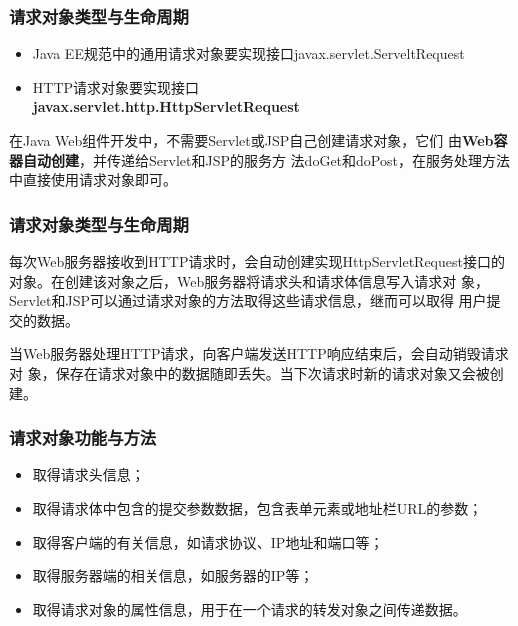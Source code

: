 \begin{frame}
  \frametitle{请求对象类型与生命周期} 
  \begin{itemize}
  \item Java EE规范中的通用请求对象要实现接口javax.servlet.ServeltRequest
  \item HTTP请求对象要实现接口\\{\bf\Red javax.servlet.http.HttpServletRequest}
  \end{itemize}


  在Java Web组件开发中，不需要Servlet或JSP自己创建请求对象，它们
  由{\bf\Blue Web容器自动创建}，并传递给Servlet和JSP的服务方
  法doGet和doPost，在服务处理方法中直接使用请求对象即可。
\end{frame}

\begin{frame}
  \frametitle{请求对象类型与生命周期} 

  每次Web服务器接收到HTTP请求时，会自动创建实现HttpServletRequest接口的
  对象。在创建该对象之后，Web服务器将请求头和请求体信息写入请求对
  象，Servlet和JSP可以通过请求对象的方法取得这些请求信息，继而可以取得
  用户提交的数据。


  当Web服务器处理HTTP请求，向客户端发送HTTP响应结束后，会自动销毁请求对
  象，保存在请求对象中的数据随即丢失。当下次请求时新的请求对象又会被创
  建。
\end{frame}

\begin{frame}[fragile] %
  \frametitle{请求对象功能与方法} 

  
  \begin{itemize}
  \item 取得请求头信息；
  \item 取得请求体中包含的提交参数数据，包含表单元素或地址栏URL的参数；
  \item 取得客户端的有关信息，如请求协议、IP地址和端口等；
  \item 取得服务器端的相关信息，如服务器的IP等；
  \item 取得请求对象的属性信息，用于在一个请求的转发对象之间传递数据。
  \end{itemize}
\end{frame}

